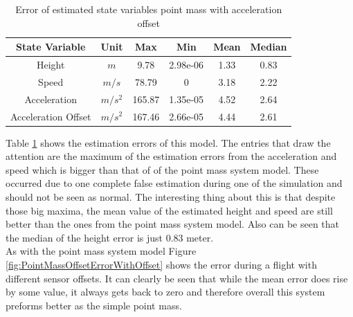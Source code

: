 \begin{table}[h!]
\centering
\begin{tabular}{cccccc}
\hline
\multicolumn{1}{|c|}{State Variable} & \multicolumn{1}{c|}{Unit} & \multicolumn{1}{c|}{Max} & \multicolumn{1}{c|}{Min} & \multicolumn{1}{c|}{Mean} & \multicolumn{1}{c|}{Median} \\ \hline
Height                            & $m$                         & 9.78                   & 2.98e-06                 & 1.33                    & 0.83                      \\
Speed                             & $m/s$                       & 78.79                  & 0                        & 3.18                    & 2.22                      \\
Acceleration                       & $m/s^2$   			& 165.87                  & 1.35e-05                 & 4.52                    & 2.64                     \\
Acceleration Offset                & $m/s^2$   			& 167.46                  & 2.66e-05                 & 4.44                    & 2.61
\end{tabular}
\caption{Error of estimated state variables point mass with acceleration offset}
\label{tab:ErrorPointMassAccelerationOffset}
\end{table}

Table \ref{tab:ErrorPointMassAccelerationOffset} shows the estimation errors of this model.
The entries that draw the attention are the maximum of the estimation errors from the acceleration and speed which is bigger than that of of the point mass system model.
These occurred due to one complete false estimation during one of the simulation and should not be seen as normal.
The interesting thing about this is that despite those big maxima, the mean value of the estimated height and speed are still better than the ones from the point mass system model.
Also can be seen that the median of the height error is just 0.83 meter. \\

As with the point mass system model Figure \ref{fig:PointMassOffsetErrorWithOffset} shows the error during a flight with different sensor offsets.
It can clearly be seen that while the mean error does rise by some value, it always gets back to zero and therefore overall this system preforms better as the simple point mass.

